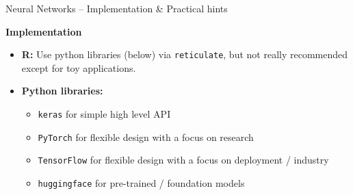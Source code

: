 \documentclass[11pt,compress,t,notes=noshow, xcolor=table]{beamer}
\newcommand{\highlight}[1]{\textcolor{hlcol}{\textbf{#1}}}
\begin{document}
\begin{frame2}
% 
% 
% 
% 
% 

\end{frame2}

\begin{frame2}{Neural Networks -- Implementation \& Practical hints}
 
\highlight{Implementation}

\begin{itemize}
  \item \textbf{R:} Use python libraries (below) via \texttt{reticulate}, but not really recommended except for toy applications.
  \item \textbf{Python libraries:} 
  \begin{itemize}
      \item \texttt{keras} for simple high level API 
      \item \texttt{PyTorch} for flexible design with a focus on research
      \item \texttt{TensorFlow} for flexible design with a focus on deployment / industry
      \item \texttt{huggingface} for pre-trained / foundation models
  \end{itemize}
\end{itemize}
\end{frame2}
\end{document}
